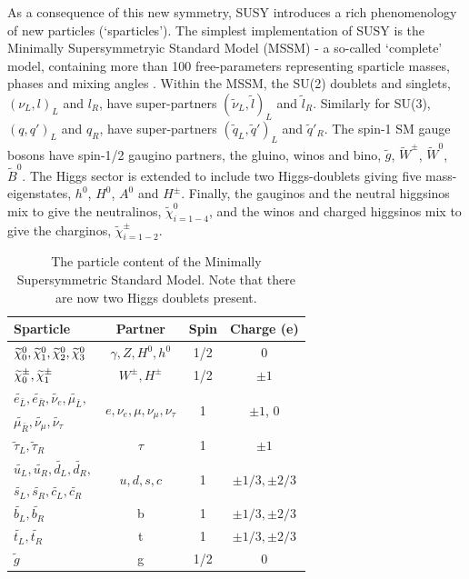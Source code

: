 As a consequence of this new symmetry, SUSY introduces a rich phenomenology of
new particles (`sparticles'). The simplest implementation of SUSY is the
Minimally
Supersymmetryic Standard Model (MSSM) \cite{Martin:1997ns} - a so-called
`complete' model, containing more than 100 free-parameters representing
sparticle masses, phases and mixing angles \cite{Dimopoulos:1995ju}.
Within the MSSM, the SU(2) doublets and singlets, $(\nu_L, l)_L$ and $l_R$,
have super-partners $(\tilde{\nu}_L, \tilde{l})_L$ and $\tilde{l}_R$. Similarly
for SU(3), $(q, q')_L$ and $q_R$,
have super-partners $(\tilde{q}_L, \tilde{q}')_L$ and $\tilde{q}'_R$. The
spin-1 SM gauge bosons have spin-1/2 gaugino partners, the gluino, winos and
bino, $\tilde{g}$, $\tilde{W}^{\pm}$, $\tilde{W}^0$, $\tilde{B}^0$.
The Higgs sector is extended to include
two Higgs-doublets giving five mass-eigenstates, $h^0$, $H^0$, $A^0$ and
$H^{\pm}$. Finally, the gauginos and the neutral higgsinos mix to give the
neutralinos, $\tilde{\chi}^0_{i=1-4}$, and the winos and charged higgsinos mix
to give the charginos, $\tilde{\chi}^{\pm}_{i=1-2}$.

\begin{table}[h!]
  \caption{The particle content of the Minimally Supersymmetric Standard
  Model. Note that there are now two Higgs doublets present.\label{tab:susy_particles}}
  \centering
  \small
  \begin{tabular}{ lccc }
    \hline
    \hline
    Sparticle         & Partner  & Spin & Charge (e) \\
    \hline
    $\widetilde{\chi}^{0}_0, \widetilde{\chi}^{0}_1, \widetilde{\chi}^{0}_2, \widetilde{\chi}^{0}_3$ & $\gamma, Z, H^0, h^0$ & 1/2 & 0 \\  
    $\widetilde{\chi}^{\pm}_0, \widetilde{\chi}^{\pm}_1$ & $W^{\pm}, H^{\pm}$ & 1/2 & $\pm1$ \\
    
    $\widetilde{e_{\bar{L}}}, \widetilde{e_{\bar{R}}},
    \widetilde{\nu_e},
    \widetilde{\mu_{\bar{L}}},$ &\multirow{2}{*}{$e, \nu_{e}, \mu, \nu_{\mu}, \nu_{\tau}$}&\multirow{2}{*}{1} & \multirow{2}{*}{$\pm 1$, 0} \\
    $ \widetilde{\mu_{\bar{R}}}, \widetilde{\nu_{\mu}},
    \widetilde{\nu_{\tau}}$ &&&\\
    
    $\widetilde{\tau}_L, \widetilde{\tau}_R$ & $\tau$ & 1  & $\pm 1$ \\
    

    $\widetilde{u_L}, \widetilde{u_R}, \widetilde{d_L},
    \widetilde {d_R},$& \multirow{2}{*}{$u, d, s, c$} & \multirow{2}{*}{1} & \multirow{2}{*}{$\pm 1/3, \pm 2/3$} \\
    $\widetilde{s_L}, \widetilde{s_R}, \widetilde{c_L}, \widetilde{c_R}$ &&& \\
    $\widetilde{b_L}, \widetilde{b_R}$ & b & 1 & $\pm 1/3, \pm 2/3$ \\
    $\widetilde{t_L}, \widetilde{t_R}$ & t & 1 & $\pm 1/3, \pm 2/3$ \\
    $\widetilde{g}$ & g & 1/2 & 0 \\
    \hline
    \hline
  \end{tabular}
\end{table}

